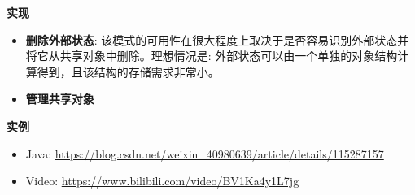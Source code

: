 \noindent\textbf{实现}

\begin{itemize}
    \item \textbf{删除外部状态}: 该模式的可用性在很大程度上取决于是否容易识别外部状态并将它从共享对象中删除。理想情况是: 外部状态可以由一个单独的对象结构计算得到，且该结构的存储需求非常小。
    \item \textbf{管理共享对象}
\end{itemize}

\noindent\textbf{实例}

\begin{itemize}
    \item Java: \url{https://blog.csdn.net/weixin_40980639/article/details/115287157}
    \item Video: \url{https://www.bilibili.com/video/BV1Ka4y1L7jg}
\end{itemize}



\newpage